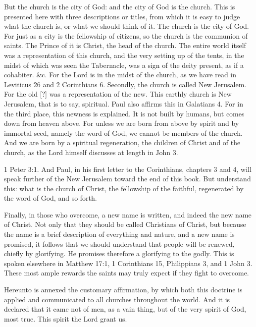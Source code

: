 But the church is the city of God: and the city of God is the church. This is presented here with three descriptions or titles, from which it is easy to judge what the church is, or what we should think of it. The church is the city of God. For just as a city is the fellowship of citizens, so the church is the communion of saints. The Prince of it is Christ, the head of the church. The entire world itself was a representation of this church, and the very setting up of the tents, in the midst of which was seen the Tabernacle, was a sign of the deity present, as if a cohabiter. \&c. For the Lord is in the midst of the church, as we have read in Leviticus 26 and 2 Corinthians 6. Secondly, the church is called New Jerusalem. For the old [?] was a representation of the new. This earthly church is New Jerusalem, that is to say, spiritual. Paul also affirms this in Galatians 4. For in the third place, this newness is explained. It is not built by humans, but comes down from heaven above. For unless we are born from above by spirit and by immortal seed, namely the word of God, we cannot be members of the church. And we are born by a spiritual regeneration, the children of Christ and of the church, as the Lord himself discusses at length in John 3.

1 Peter 3:1. And Paul, in his first letter to the Corinthians, chapters 3 and 4, will speak further of the New Jerusalem toward the end of this book. But understand this: what is the church of Christ, the fellowship of the faithful, regenerated by the word of God, and so forth.

Finally, in those who overcome, a new name is written, and indeed the new name of Christ. Not only that they should be called Christians of Christ, but because the name is a brief description of everything and nature, and a new name is promised, it follows that we should understand that people will be renewed, chiefly by glorifying. He promises therefore a glorifying to the godly. This is spoken elsewhere in Matthew 17:1, 1 Corinthians 15, Philippians 3, and 1 John 3. These most ample rewards the saints may truly expect if they fight to overcome.

Hereunto is annexed the customary affirmation, by which both this doctrine is applied and communicated to all churches throughout the world. And it is declared that it came not of men, as a vain thing, but of the very spirit of God, most true. This spirit the Lord grant us.
